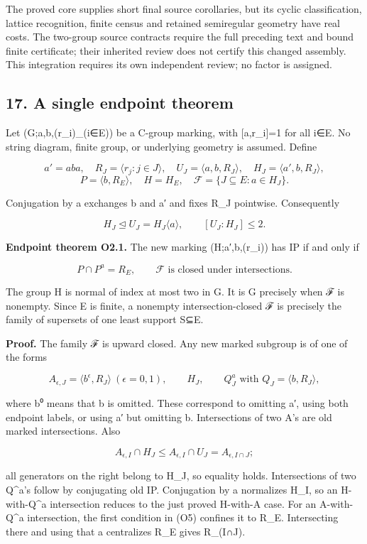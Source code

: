 \documentclass[
  10pt,
  letterpaper,
]{article}
\newcounter{none} %
\begin{document}
The proved core supplies short final source corollaries, but its cyclic
classification, lattice recognition, finite census and retained
semiregular geometry have real costs. The two-group source contracts
require the full preceding text and bound finite certificate; their
inherited review does not certify this changed assembly. This
integration requires its own independent review; no factor is assigned.

\subsection{17. A single endpoint
theorem}\label{a-single-endpoint-theorem}

Let (G;a,b,(r\_i)\_(i∈E)) be a C-group marking, with {[}a,r\_i{]}=1 for
all i∈E. No string diagram, finite group, or underlying geometry is
assumed. Define

\[
a'=aba,\quad R_J=\langle r_j:j\in J\rangle,\quad
U_J=\langle a,b,R_J\rangle,\quad H_J=\langle a',b,R_J\rangle,
\] \[
P=\langle b,R_E\rangle,\quad H=H_E,\quad
\mathcal F=\{J\subseteq E:a\in H_J\}.
\tag{O3}
\]

Conjugation by a exchanges b and a′ and fixes R\_J pointwise.
Consequently

\[
H_J\trianglelefteq U_J=H_J\langle a\rangle,
\qquad [U_J:H_J]\le2.
\tag{O4}
\]

\textbf{Endpoint theorem O2.1.} The new marking (H;a′,b,(r\_i)) has IP
if and only if

\[
P\cap P^a=R_E,
\qquad \mathcal F\text{ is closed under intersections}.
\tag{O5}
\]

The group H is normal of index at most two in G. It is G precisely when
ℱ is nonempty. Since E is finite, a nonempty intersection-closed ℱ is
precisely the family of supersets of one least support S⊆E.

\textbf{Proof.} The family ℱ is upward closed. Any new marked subgroup
is of one of the forms

\[
A_{\epsilon,J}=\langle b^\epsilon,R_J\rangle\ (\epsilon=0,1),
\qquad H_J,\qquad Q_J^a\text{ with }Q_J=\langle b,R_J\rangle,
\tag{O6}
\]

where b⁰ means that b is omitted. These correspond to omitting a′, using
both endpoint labels, or using a′ but omitting b. Intersections of two
A's are old marked intersections. Also

\[
A_{\epsilon,I}\cap H_J
\le A_{\epsilon,I}\cap U_J=A_{\epsilon,I\cap J};
\]

all generators on the right belong to H\_J, so equality holds.
Intersections of two Q\^{}a's follow by conjugating old IP. Conjugation
by a normalizes H\_I, so an H-with-Q\^{}a intersection reduces to the
just proved H-with-A case. For an A-with-Q\^{}a intersection, the first
condition in (O5) confines it to R\_E. Intersecting there and using that
a centralizes R\_E gives R\_(I∩J).
\end{document}
